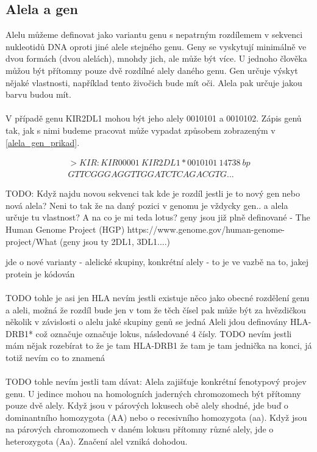 \documentclass[czech,DP]{thesiskiv}
\numberwithin{equation}{section}
\begin{document}
\subsection{Alela a gen}
Alelu můžeme definovat jako variantu genu s nepatrným rozdílemem v sekvenci nukleotidů DNA oproti jiné alele stejného genu. Geny se vyskytují minimálně ve dvou formách (dvou alelách), mnohdy jich, ale může být více. U jednoho člověka můžou být přítomny pouze dvě rozdílné alely daného genu. Gen určuje výskyt nějaké vlastnosti, například tento živočich bude mít oči. Alela pak určuje jakou barvu budou mít.
\\
\\
V případě genu KIR2DL1 mohou být jeho alely 0010101 a 0010102. Zápis genů tak, jak s nimi budeme pracovat může vypadat způsobem zobrazeným v \ref{alela_gen_prikad}. 

\begin{equation}\begin{split} 
   \label{alela_gen_prikad}
   		>KIR:KIR00001\: KIR2DL1*0010101\: 14738\: bp \\
		GTTCGGGAGGTTGGATCTCAGACGTG...
\end{split}\end{equation}

TODO: Když najdu novou sekvenci tak kde je rozdíl jestli je to nový gen nebo nová alela? Neni to tak že na daný pozici v genomu je vždycky gen.. a alela určuje tu vlastnost? A na co je mi teda lotus? 
geny jsou již plně definované - The Human Genome Project (HGP) https://www.genome.gov/human-genome-project/What (geny jsou ty 2DL1, 3DL1....)

jde o nové varianty - alelické skupiny, konkrétní alely - to je ve vazbě na to, jakej protein je kódován
\\
\\
TODO tohle je asi jen HLA nevím jestli existuje něco jako obecné rozdělení genu a aleli, možná že rozdíl bude jen v tom že těch čísel pak může být za hvězdičkou několik v závislosti o alelu jaké skupiny genů se jedná
Aleli jdou definovány HLA-DRB1* což označuje označuje lokus, následované 4 čísly. 
TODO nevím jestli mám nějak rozebírat to že je tam HLA-DRB1 že tam je tam jednička na konci, já totiž nevím co to znamená
\\
\\
TODO tohle nevím jestli tam dávat: 
Alela zajišťuje konkrétní fenotypový projev genu. U jedince mohou na homologních jaderných chromozomech být přítomny pouze dvě alely. Když jsou v párových lokusech obě alely shodné, jde buď o dominantního homozygota (AA) nebo o recesivního homozygota (aa). Když jsou na párových chromozomech v daném lokusu přítomny různé alely, jde o heterozygota (Aa). Značení alel vzniká dohodou.
\end{document}
